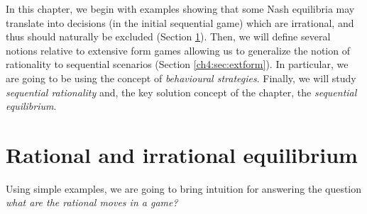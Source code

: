 In this chapter, we begin with examples showing that
some Nash equilibria may translate into decisions (in the initial sequential game) which are irrational, and thus should naturally be excluded (Section \ref{ch4:sec:motivations}). Then, we will define several notions relative to extensive form games allowing us to generalize the notion of rationality to sequential scenarios (Section \ref{ch4:sec:extform}). In particular, we are going to be using the concept of \emph{behavioural strategies}. Finally, we will study  \emph{sequential rationality} and,  the key solution concept of the chapter, the \emph{sequential equilibrium}.





\section{Rational and irrational equilibrium}
\label{ch4:sec:motivations}
Using simple examples, we are going to bring intuition for answering the question \emph{what are the rational moves in a game?}

